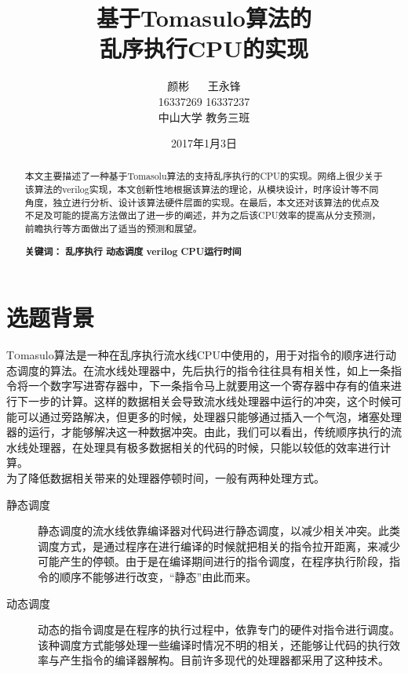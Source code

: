 \documentclass[twoside]{article}
\title{\vspace{-15mm}\fontsize{24pt}{10pt}\selectfont\textbf{基于Tomasulo算法的\\乱序执行CPU的实现}} %
\author{
\large
\textsc{颜彬 \(\quad\) 王永锋}\\[2mm] %
\textsc{16337269 16337237} \\ [2mm]
\normalsize 中山大学 教务三班  \\ %
\vspace{-5mm}
}
\date{2017年1月3日}
\begin{document}
\maketitle %

\thispagestyle{fancy} %

\begin{abstract}
	本文主要描述了一种基于Tomasolu算法的支持乱序执行的CPU的实现。网络上很少关于该算法的verilog实现，本文创新性地根据该算法的理论，从模块设计，时序设计等不同角度，独立进行分析、设计该算法硬件层面的实现。在最后，本文还对该算法的优点及不足及可能的提高方法做出了进一步的阐述，并为之后该CPU效率的提高从分支预测，前瞻执行等方面做出了适当的预测和展望。

	\textbf{关键词： }\textbf{乱序执行} \textbf{动态调度} \textbf{verilog} \textbf{CPU运行时间}
\end{abstract}


\section{选题背景}
\lettrine[nindent=0em,lines=3]{T}omasulo算法是一种在乱序执行流水线CPU中使用的，用于对指令的顺序进行动态调度的算法。在流水线处理器中，先后执行的指令往往具有相关性，如上一条指令将一个数字写进寄存器中，下一条指令马上就要用这一个寄存器中存有的值来进行下一步的计算。这样的数据相关会导致流水线处理器中运行的冲突，这个时候可能可以通过旁路解决，但更多的时候，处理器只能够通过插入一个气泡，堵塞处理器的运行，才能够解决这一种数据冲突。由此，我们可以看出，传统顺序执行的流水线处理器，在处理具有极多数据相关的代码的时候，只能以较低的效率进行计算。\\

为了降低数据相关带来的处理器停顿时间，一般有两种处理方式。\cite{book:zcs}
\begin{description}
	\item[静态调度] 静态调度的流水线依靠编译器对代码进行静态调度，以减少相关冲突。此类调度方式，是通过程序在进行编译的时候就把相关的指令拉开距离，来减少可能产生的停顿。由于是在编译期间进行的指令调度，在程序执行阶段，指令的顺序不能够进行改变，“静态”由此而来。
	\item[动态调度]	动态的指令调度是在程序的执行过程中，依靠专门的硬件对指令进行调度。该种调度方式能够处理一些编译时情况不明的相关，还能够让代码的执行效率与产生指令的编译器解构。目前许多现代的处理器都采用了这种技术。
\end{description}
\end{document}
